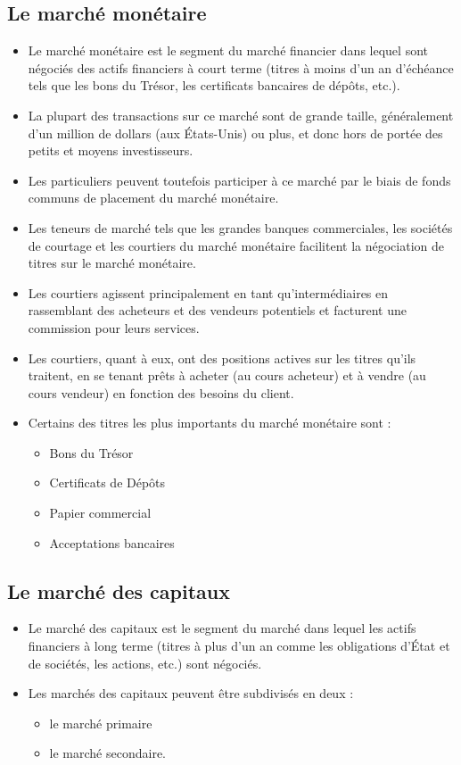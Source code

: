 \documentclass[letterpaper, 12pt]{article}
\newcommand{\1}{\mathds{1}}	%
\theoremstyle{definition}
\begin{document}
\subsection{Le marché monétaire }
\begin{itemize}

\item Le marché monétaire est le segment du marché financier dans lequel sont négociés des actifs financiers à court terme (titres à moins d'un an d'échéance tels que les bons du Trésor, les certificats bancaires de dépôts, etc.). 
\item La plupart des transactions sur ce marché sont de grande taille, généralement d'un million de dollars (aux États-Unis) ou plus, et donc hors de portée des petits et moyens investisseurs. \item Les particuliers peuvent toutefois participer à ce marché par le biais de fonds communs de placement du marché monétaire. 
\item Les teneurs de marché tels que les grandes banques commerciales, les sociétés de courtage et les courtiers du marché monétaire facilitent la négociation de titres sur le marché monétaire. 
\item Les courtiers agissent principalement en tant qu'intermédiaires en rassemblant des acheteurs et des vendeurs potentiels et facturent une commission pour leurs services. 
\item Les courtiers, quant à eux, ont des positions actives sur les titres qu'ils traitent, en se tenant prêts à acheter (au cours acheteur) et à vendre (au cours vendeur) en fonction des besoins du client.
\item Certains des titres les plus importants du marché monétaire sont :
\begin{itemize}
\item Bons du Trésor
\item Certificats de Dépôts 
\item Papier commercial
\item Acceptations bancaires
\end{itemize}
\end{itemize}

\subsection{Le marché des capitaux}
\begin{itemize}
\item Le marché des capitaux est le segment du marché dans lequel les actifs financiers à long terme (titres à plus d'un an comme les obligations d'État et de sociétés, les actions, etc.) sont négociés. 
\item Les marchés des capitaux peuvent être subdivisés en deux : 
\begin{itemize}
\item le marché primaire 
\item le marché secondaire.
\end{itemize}
\end{itemize}
\end{document}
